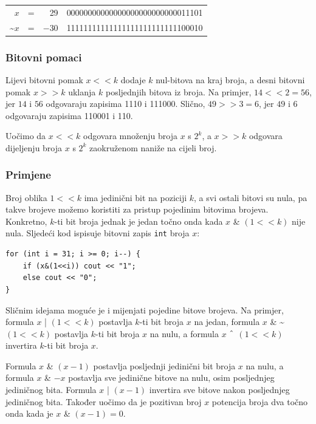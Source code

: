 \begin{center}
\begin{tabular}{rrrr}
$x$ & = & 29 &   00000000000000000000000000011101 \\
\textasciitilde$x$ & = & $-30$ & 11111111111111111111111111100010 \\
\end{tabular}
\end{center}

\subsubsection{Bitovni pomaci}


Lijevi bitovni pomak $x < < k$ dodaje $k$
nul-bitova na kraj broja,
a desni bitovni pomak $x > > k$
uklanja $k$ posljednjih bitova iz broja.
Na primjer, $14 < < 2 = 56$,
jer $14$ i $56$ odgovaraju zapisima 1110 i 111000.
Slično, $49 > > 3 = 6$,
jer $49$ i $6$ odgovaraju zapisima 110001 i 110.

Uočimo da $x < < k$
odgovara množenju broja $x$ s $2^k$,
a $x > > k$
odgovara dijeljenju broja $x$ s $2^k$
zaokruženom naniže na cijeli broj.

\subsubsection{Primjene}

Broj oblika $1 < < k$ ima jedinični bit
na poziciji $k$, a svi ostali bitovi su nula,
pa takve brojeve možemo koristiti za pristup pojedinim bitovima brojeva.
Konkretno, $k$-ti bit broja jednak je jedan
točno onda kada $x$ \& $(1 < < k)$ nije nula.
Sljedeći kod ispisuje bitovni zapis
\texttt{int} broja $x$:

\begin{lstlisting}
for (int i = 31; i >= 0; i--) {
    if (x&(1<<i)) cout << "1";
    else cout << "0";
}
\end{lstlisting}

Sličnim idejama moguće je i mijenjati pojedine bitove
brojeva.
Na primjer, formula $x$ | $(1 < < k)$
postavlja $k$-ti bit broja $x$ na jedan,
formula
$x$ \& \textasciitilde $(1 < < k)$
postavlja $k$-ti bit broja $x$ na nulu,
a formula
$x$ $\XOR$ $(1 < < k)$
invertira $k$-ti bit broja $x$.

Formula $x$ \& $(x-1)$ postavlja posljednji
jedinični bit broja $x$ na nulu,
a formula $x$ \& $-x$ postavlja sve
jedinične bitove na nulu, osim posljednjeg jediničnog bita.
Formula $x$ | $(x-1)$
invertira sve bitove nakon posljednjeg jediničnog bita.
Također uočimo da je pozitivan broj $x$
potencija broja dva točno onda kada je $x$ \& $(x-1) = 0$.

